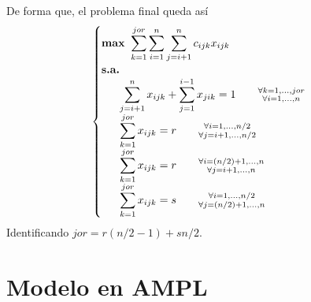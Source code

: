 \documentclass[12pt,a4paper,table]{article}
\theoremstyle{break}
\begin{document}
De forma que, el problema final queda así
\[
	\begin{cases}\displaystyle
		\textbf{max } \sum^{jor}_{k=1} \sum^n_{i=1}
		\sum^{n}_{j=i+1} c_{ijk} x_{ijk} \\
		\textbf{s.a.} \\
		\displaystyle
		\indent\sum^n_{j = i+1} x_{ijk} + \sum^{i-1}_{j = 1} x_{jik} = 1 \qquad
		\substack{\forall k=1,\dots,jor \\ \forall i = 1,\dots,n} \\
		\displaystyle
		\indent\sum^{jor}_{k=1} x_{ijk} = r \qquad
		\substack{\forall i=1,\dots,n/2 \\ \forall j=i+1,\dots,n/2} \\
		\displaystyle
		\indent\sum^{jor}_{k=1} x_{ijk} = r \qquad
		\substack{\forall i=(n/2)+1,\dots,n \\ \forall j=i+1,\dots,n} \\
		\displaystyle
		\indent\sum^{jor}_{k=1} x_{ijk} = s \qquad
		\substack{\forall i=1,\dots,n/2 \\ \forall j=(n/2)+1,\dots,n}
	\end{cases}
\]
Identificando $jor = r(n/2 - 1) + sn/2$.

\section{Modelo en AMPL}
\end{document}
